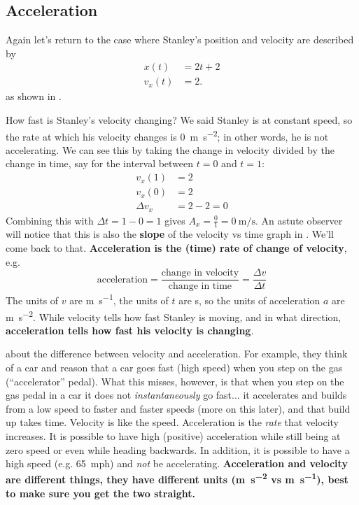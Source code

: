\documentclass{tufte-handout}
\begin{document}
\subsection{Acceleration}
Again let's return to the case where Stanley's position and velocity are described by
\begin{align}
x(t) &= 2 t + 2 \\
v_x(t) &= 2. 
\end{align}
as shown in .
\begin{marginfigure}
\caption{Stanley's position, velocity, and acceleration}
\label{fig:acceleration1}
\end{marginfigure}
How fast is Stanley's velocity changing? We said Stanley is at constant speed, so the rate at which his velocity changes is \SI{0}{\meter\per\second\squared}; in other words, he is not accelerating. We can see this by taking the change in velocity divided by the change in time, say for the interval between $t=0$ and $t=1$:
\begin{align}
v_x(1) &= 2 \\
v_x(0) &= 2 \\
\Delta v_x &= 2 - 2 = 0
\end{align}
Combining this with $\Delta t = 1-0 = 1$ gives $A_x=\frac{0}{1}=\SI{0}{\meter\per\second}$. An astute observer will notice that this is also the \textbf{slope} of the velocity vs time graph in . We'll come back to that.  \textbf{Acceleration is the (time) rate of change of velocity}, e.g.
\begin{equation}
\text{acceleration} = \dfrac{\text{change in velocity}}{\text{change in time}} = \dfrac{\Delta v}{\Delta t}
\end{equation}
The units of $v$ are \si{\meter\per\second}, the units of $t$ are \si{\second}, so the units of acceleration $a$ are \si{\meter\per\second\squared}. While velocity tells how fast Stanley is moving, and in what direction, \textbf{acceleration tells how fast his velocity is changing}. 

 about the difference between velocity and acceleration. For example, they think of a car and reason that a car goes fast (high speed) when you step on the gas (``accelerator'' pedal). What this misses, however, is that when you step on the gas pedal in a car it does not \emph{instantaneously} go fast... it accelerates and builds from a low speed to faster and faster speeds (more on this later), and that build up takes time. Velocity is like the speed. Acceleration is the \emph{rate} that velocity increases. It is possible to have high (positive) acceleration while still being at zero speed or even while heading backwards. In addition, it is possible to have a high speed (e.g. \SI{65}{mph}) and \emph{not} be accelerating. \textbf{Acceleration and velocity are different things, they have different units (\si{\meter\per\second\squared} vs \si{\meter\per\second}), best to make sure you get the two straight.} 
\end{document}
